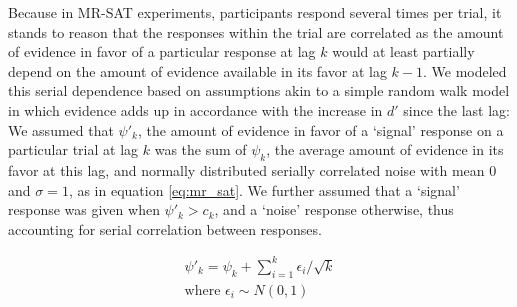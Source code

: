 \documentclass[10pt,letterpaper]{article}
\begin{document}
Because in MR-SAT experiments, participants respond several times per trial, it stands to reason that the responses within the trial are correlated as the amount of evidence in favor of a particular response at lag \(k\) would at least partially depend on the amount of evidence available in its favor at lag \(k-1\). We modeled this serial dependence based on assumptions akin to a simple random walk model in which evidence adds up in accordance with the increase in $d'$ since the last lag: We assumed that \(\psi'_k\), the amount of evidence in favor of a `signal' response on a particular trial at lag \(k\) was the sum of \(\psi_k\), the average amount of evidence in its favor at this lag, and normally distributed serially correlated noise with mean $0$ and $\sigma=1$, as in equation \ref{eq:mr_sat}. We further assumed that a `signal' response was given when $\psi'_k > c_k$, and a `noise' response otherwise, thus accounting for serial correlation between responses.

\begin{equation}
\begin{split}
   \psi'_k = \psi_k + \sum_{i=1}^{k} \epsilon_i/\sqrt{k} \\
            \text{where } \epsilon_i \sim N(0, 1)
\end{split}
\label{eq:mr_sat}
\end{equation}
\end{document}
